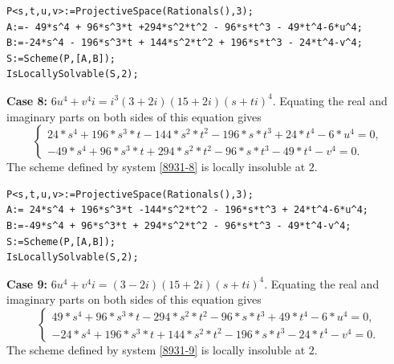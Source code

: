\documentclass[a4paper,12pt,english,reqno]{amsart}
\begin{document}
\begin{lstlisting}
P<s,t,u,v>:=ProjectiveSpace(Rationals(),3);
A:=- 49*s^4 + 96*s^3*t +294*s^2*t^2 - 96*s*t^3 - 49*t^4-6*u^4;
B:=-24*s^4 - 196*s^3*t + 144*s^2*t^2 + 196*s*t^3 - 24*t^4-v^4;
S:=Scheme(P,[A,B]);
IsLocallySolvable(S,2);
\end{lstlisting}


{\bf Case 8:} $6u^4+v^4i=i^3(3+2i)(15+2i)(s+ti)^4$.  Equating the real and imaginary parts on both sides of this equation gives
\begin{equation}\label{8931-8}
\begin{cases}
24*s^4 + 196*s^3*t - 144*s^2*t^2 - 196*s*t^3 + 24*t^4 - 6*u^4=0,\\
-49*s^4 + 96*s^3*t + 294*s^2*t^2 - 96*s*t^3 - 49*t^4 - v^4=0.
\end{cases}
\end{equation}
The scheme defined by system \eqref{8931-8} is locally insoluble at $2$.

\begin{lstlisting}
P<s,t,u,v>:=ProjectiveSpace(Rationals(),3);
A:= 24*s^4 + 196*s^3*t -144*s^2*t^2 - 196*s*t^3 + 24*t^4-6*u^4;
B:=-49*s^4 + 96*s^3*t + 294*s^2*t^2 - 96*s*t^3 - 49*t^4-v^4;
S:=Scheme(P,[A,B]);
IsLocallySolvable(S,2);
\end{lstlisting}

{\bf Case 9:} $6u^4+v^4i=(3-2i)(15+2i)(s+ti)^4$. Equating the real and imaginary parts on both sides of this equation gives
\begin{equation}\label{8931-9}
\begin{cases}
49*s^4 + 96*s^3*t - 294*s^2*t^2 - 96*s*t^3 + 49*t^4 - 6*u^4=0,\\
-24*s^4 + 196*s^3*t + 144*s^2*t^2 - 196*s*t^3 - 24*t^4 - v^4=0.
\end{cases}
\end{equation}
The scheme defined by system \eqref{8931-9} is locally insoluble at $2$.
\end{document}
